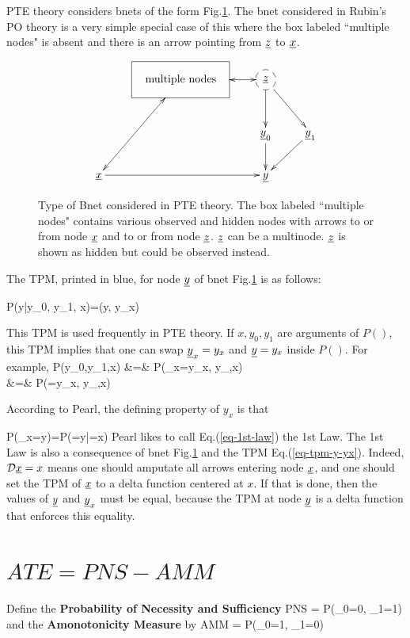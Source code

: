 PTE theory considers bnets of the form
Fig.\ref{fig-pte-bnet}.
The bnet considered in Rubin's
PO theory
is a very simple special case
of this where the box
labeled ``multiple nodes"
is absent and there is an
arrow pointing
from ${\underline{z}}$ to ${\underline{x}}$.


\begin{figure}[h!]
$$
\xymatrix{
&*++++[F]{\text{multiple nodes}}\ar@{<->}[ldd]
\ar@{<->}[r]
&*++[F-o]{\rvz}\ar[rd]\ar[d]
\\
&&\rvy_0\ar[d]
&\rvy_1\ar[ld]
\\
\rvx\ar[rr]
&&\rvy
}$$
\caption{Type of Bnet
considered in PTE theory.
The box labeled ``multiple nodes"
contains various observed
and hidden nodes with
arrows
to or from node ${\underline{x}}$
and to or from
node ${\underline{z}}$.
${\underline{z}}$ can be a multinode.
${\underline{z}}$
is shown
as hidden but
could be observed instead.
}
\label{fig-pte-bnet}
\end{figure}

The TPM, printed in blue,
 for node ${\underline{y}}$
of bnet Fig.\ref{fig-pte-bnet}
is as follows:


\beq\color{blue}
P(y|y_0, y_1, x)=\delta(y, y_x)
\label{eq-tpm-y-yx}
\eeq

This TPM is used
frequently
in PTE theory.  If $x,y_0, y_1$
are arguments
of $P()$, this TPM implies that one
can swap
${\underline{y}}_x=y_x$
and ${\underline{y}}=y_x$
inside $P()$. For example,
\beqa
P(y_0,y_1,x)
&=&
P({\color{red}\rvy_x}=y_x,
 y_{},x)
\\
&=&
P({\color{red}\rvy}=y_x,
 y_{},x)
\eeqa

According to Pearl, the defining
property of $y_x$ is that


\beq
P(\rvy_x=y)=P(\rvy=y|\cald\rvx=x)
\label{eq-1st-law}
\eeq
Pearl likes to call
Eq.(\ref{eq-1st-law})
the 1st Law. The 1st Law is also a
consequence of bnet Fig.\ref{fig-pte-bnet}
and the TPM Eq.(\ref{eq-tpm-y-yx}).
Indeed,
${\cal D}{\underline{x}}=x$
means one should amputate
all arrows entering
node ${\underline{x}}$, and one should set
the TPM of ${\underline{x}}$ to a delta
function centered at $x$.
If that is done, then
the values
of ${\underline{y}}$ and ${\underline{y}}_x$ must
be equal,
because the TPM at node ${\underline{y}}$
is a delta function that
enforces this equality.

\section{$ATE = PNS - AMM$}

Define the {\bf Probability of Necessity and Sufficiency}
\beq
PNS = P(\rvy_0=0, \rvy_1=1)
\eeq
and the {\bf Amonotonicity Measure} by
\beq
AMM = P(\rvy_0=1, \rvy_1=0)
\eeq

